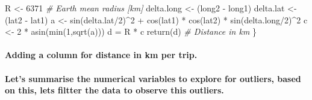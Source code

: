 \documentclass[
]{article}
\newenvironment{Shaded}{\begin{snugshade}}{\end{snugshade}}
\newcommand{\AttributeTok}[1]{\textcolor[rgb]{0.77,0.63,0.00}{#1}}
\newcommand{\CommentTok}[1]{\textcolor[rgb]{0.56,0.35,0.01}{\textit{#1}}}
\newcommand{\DecValTok}[1]{\textcolor[rgb]{0.00,0.00,0.81}{#1}}
\newcommand{\FunctionTok}[1]{\textcolor[rgb]{0.00,0.00,0.00}{#1}}
\newcommand{\NormalTok}[1]{#1}
\newcommand{\OtherTok}[1]{\textcolor[rgb]{0.56,0.35,0.01}{#1}}
\newcommand{\SpecialCharTok}[1]{\textcolor[rgb]{0.00,0.00,0.00}{#1}}
\begin{document}
\begin{Shaded}
\begin{Highlighting}[]
\NormalTok{  R }\OtherTok{\textless{}{-}} \DecValTok{6371} \CommentTok{\# Earth mean radius [km]}
\NormalTok{  delta.long }\OtherTok{\textless{}{-}}\NormalTok{ (long2 }\SpecialCharTok{{-}}\NormalTok{ long1)}
\NormalTok{  delta.lat }\OtherTok{\textless{}{-}}\NormalTok{ (lat2 }\SpecialCharTok{{-}}\NormalTok{ lat1)}
\NormalTok{  a }\OtherTok{\textless{}{-}} \FunctionTok{sin}\NormalTok{(delta.lat}\SpecialCharTok{/}\DecValTok{2}\NormalTok{)}\SpecialCharTok{\^{}}\DecValTok{2} \SpecialCharTok{+} \FunctionTok{cos}\NormalTok{(lat1) }\SpecialCharTok{*} \FunctionTok{cos}\NormalTok{(lat2) }\SpecialCharTok{*} \FunctionTok{sin}\NormalTok{(delta.long}\SpecialCharTok{/}\DecValTok{2}\NormalTok{)}\SpecialCharTok{\^{}}\DecValTok{2}
\NormalTok{  c }\OtherTok{\textless{}{-}} \DecValTok{2} \SpecialCharTok{*} \FunctionTok{asin}\NormalTok{(}\FunctionTok{min}\NormalTok{(}\DecValTok{1}\NormalTok{,}\FunctionTok{sqrt}\NormalTok{(a)))}
\NormalTok{  d }\OtherTok{=}\NormalTok{ R }\SpecialCharTok{*}\NormalTok{ c}
  \FunctionTok{return}\NormalTok{(d) }\CommentTok{\# Distance in km}
\NormalTok{\}}
\end{Highlighting}
\end{Shaded}

\hypertarget{adding-a-column-for-distance-in-km-per-trip.}{%
\paragraph{Adding a column for distance in km per
trip.}\label{adding-a-column-for-distance-in-km-per-trip.}}

\begin{Shaded}
\end{Shaded}

\hypertarget{lets-summarise-the-numerical-variables-to-explore-for-outliers-based-on-this-lets-filtter-the-data-to-observe-this-outliers.}{%
\paragraph{Let's summarise the numerical variables to explore for
outliers, based on this, lets filtter the data to observe this
outliers.}\label{lets-summarise-the-numerical-variables-to-explore-for-outliers-based-on-this-lets-filtter-the-data-to-observe-this-outliers.}}
\end{document}
